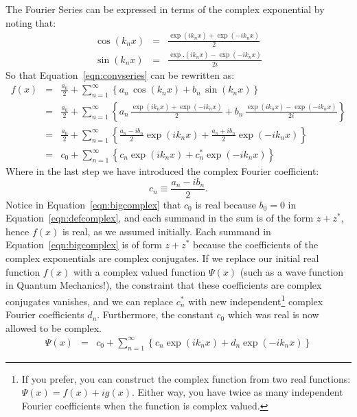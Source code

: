 \documentclass[12pt,oneside]{book}
\begin{document}
The Fourier Series can be expressed in terms of the complex exponential by noting that:
\begin{eqnarray*}
\cos(k_n x) &=& \frac{\exp(i k_n x) + \exp(-i k_n x)}{2} \\
\sin(k_n x) &=& \frac{\exp.(i k_n x) - \exp(-i k_n x)}{2i}
\end{eqnarray*}
So that Equation~\ref{eqn:convseries} can be rewritten as:
\begin{eqnarray}
f(x) &=& \frac{a_0}{2} + \sum_{n=1}^{\infty}  \left\{ a_n \, \cos(k_n x ) + b_n \, \sin( k_n x ) \right\} \nonumber \\
&=& \frac{a_0}{2}+ \sum_{n=1}^{\infty}  \left\{ a_n \,  \frac{\exp(i k_n x) + \exp(-i k_n x)}{2} 
+ b_n \, \frac{\exp(i k_n x) - \exp(-i k_n x)}{2i} \right\} \nonumber \\
&=& \frac{a_0}{2} + \sum_{n=1}^{\infty}  \left\{ \frac{a_n - i b_n}{2} \exp(i k_n x) + 
\frac{a_n + i b_n}{2} \exp(-i k_n x) \right\} \nonumber \\
&=& c_0 + \sum_{n=1}^{\infty}  \left\{ c_n \exp(i k_n x) + 
c_n^* \exp(-i k_n x) \right\}  \label{eqn:bigcomplex}
\end{eqnarray}
Where in the last step we have introduced the complex Fourier coefficient:
\begin{equation}
c_n \equiv \frac{a_n - i b_n}{2}. \label{eqn:defcomplex}
\end{equation}
Notice in Equation~\ref{eqn:bigcomplex} that $c_0$ is real because $b_0 = 0$ in Equation~\ref{eqn:defcomplex}, and each summand in the sum is of the form $z+z^*$, hence $f(x)$ is real, as we assumed initially.  Each summand in Equation~\ref{eqn:bigcomplex} is of form $z+z^*$ because the coefficients of the complex exponentials are complex conjugates.  If we replace our initial real function $f(x) $ with a complex valued function $\Psi(x)$ (such as a wave function in Quantum Mechanics!), the constraint that these coefficients are complex conjugates vanishes, and we can replace $c_n^*$ with new independent\footnote{If you prefer, you can construct the complex function from two real functions:  $\Psi(x) = f(x) + i g(x)$.  Either way, you have twice as many independent Fourier coefficients when the function is complex valued.} complex Fourier coefficients $d_n$.   Furthermore, the constant $c_0$ which was real is now allowed to be complex.
\begin{eqnarray*}
\Psi(x)  &=& c_0 + \sum_{n=1}^{\infty}  \left\{ c_n \exp(i k_n x) + 
d_n \exp(-i k_n x) \right\} 
\end{eqnarray*}
\end{document}

